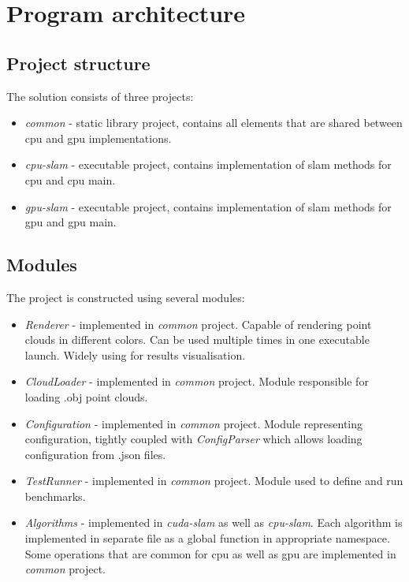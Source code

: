 \documentclass[titlepage]{article}
\begin{document}
\section{Program architecture}
\subsection{Project structure}
The solution consists of three projects:
\begin{itemize}
\item \textit{common} - static library project, contains all elements that are shared between cpu and gpu implementations.
\item \textit{cpu-slam} - executable project, contains implementation of slam methods for cpu and cpu main.
\item \textit{gpu-slam} - executable project, contains implementation of slam methods for gpu and gpu main.
\end{itemize}

\subsection{Modules}
The project is constructed using several modules:
\begin{itemize}
\item \textit{Renderer} - implemented in \textit{common} project. Capable of rendering point clouds in different colors. Can be used multiple times in one executable launch. Widely using for results visualisation.
\item \textit{CloudLoader} - implemented in \textit{common} project. Module responsible for loading .obj point clouds.
\item \textit{Configuration} - implemented in \textit{common} project. Module representing configuration, tightly coupled with \textit{ConfigParser} which allows loading configuration from .json files.
\item \textit{TestRunner} - implemented in \textit{common} project. Module used to define and run benchmarks.
\item \textit{Algorithms} - implemented in \textit{cuda-slam} as well as \textit{cpu-slam}. Each algorithm is implemented in separate file as a global function in appropriate namespace. Some operations that are common for cpu as well as gpu are implemented in \textit{common} project.
\end{itemize}
\end{document}
